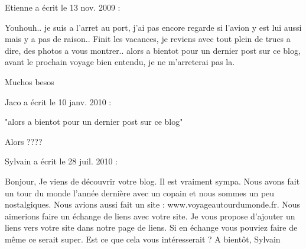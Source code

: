\medskip
Etienne a écrit le 13 nov. 2009 :
\begin{displayquote}
Youhouh.. je suis a l'arret au port, j'ai pas encore regarde si l'avion y est lui aussi mais y a pas de raison..
Finit les vacances, je reviens avec tout plein de trucs a dire, des photos a vous montrer.. alors a bientot pour un dernier post sur ce blog, avant le prochain voyage bien entendu, je ne m'arreterai pas la.

Muchos besos
\end{displayquote}

\medskip
Jaco a écrit le 10 janv. 2010 :
\begin{displayquote}
"alors a bientot pour un dernier post sur ce blog"

Alors ????
\end{displayquote}

\medskip
Sylvain a écrit le 28 juil. 2010 :
\begin{displayquote}
Bonjour,
Je viens de découvrir votre blog. Il est vraiment sympa. Nous avons fait un tour du monde l'année dernière avec un copain et nous sommes un peu nostalgiques.
Nous avions aussi fait un site : www.voyageautourdumonde.fr. Nous aimerions faire un échange de liens avec votre site. Je vous propose d'ajouter un liens vers votre site dans notre page de liens. Si en échange vous pouviez faire de même ce serait super.
Est ce que cela vous intéresserait ?
A bientôt,
Sylvain
\end{displayquote}

\vfill
